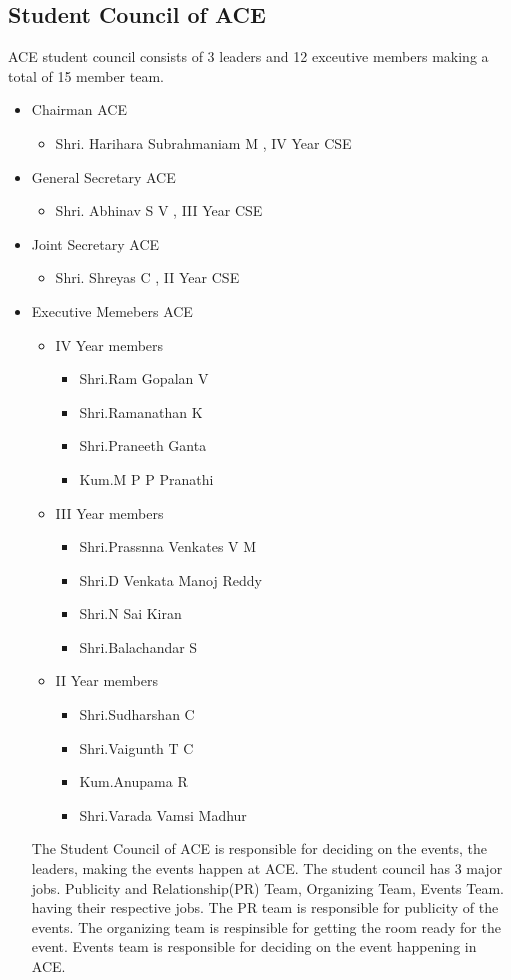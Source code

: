 \documentclass[paper=a4, fontsize=11pt]{scrartcl}
\numberwithin{equation}{section}		%
\numberwithin{figure}{section}			%
\numberwithin{table}{section}				%
\begin{document}
\subsection{Student Council of ACE}
ACE student council consists of 3 leaders and 12 exceutive members making a total of 15 member  team.
\begin{itemize}
	\item Chairman ACE
		\begin{itemize}
		\item  Shri. Harihara Subrahmaniam M  , IV Year CSE
		\end{itemize}
	\item General Secretary ACE
    	\begin{itemize}
		\item  Shri. Abhinav S V , III Year CSE
		\end{itemize}
     \item Joint Secretary ACE
    	\begin{itemize}
		\item  Shri. Shreyas C , II Year CSE
		\end{itemize}
      \item Executive Memebers ACE
    	\begin{itemize}
		\item  IV Year members
        	\begin{itemize}
			\item Shri.Ram Gopalan V
			\item Shri.Ramanathan K
			\item Shri.Praneeth Ganta
			\item Kum.M P P Pranathi
			\end{itemize}	
        \item  III Year members
        	\begin{itemize}
			\item  Shri.Prassnna Venkates V M
            \item  Shri.D Venkata Manoj Reddy
            \item  Shri.N Sai Kiran
            \item  Shri.Balachandar S
			\end{itemize}	
        \item  II Year members
        	\begin{itemize}
			\item Shri.Sudharshan C
			\item Shri.Vaigunth T C
			\item Kum.Anupama R
			\item Shri.Varada Vamsi Madhur
			\end{itemize}	
		\end{itemize}
        The Student Council of ACE is responsible for deciding on the events, the leaders, making the events happen at ACE. The student council has 3 major jobs. Publicity and Relationship(PR) Team, Organizing Team, Events Team. having their respective jobs. The PR team is responsible for publicity of the events. The organizing team is respinsible for getting the room ready for the event. Events team is responsible for deciding on the event happening in ACE.
        
	
\end{itemize}
\end{document}
